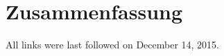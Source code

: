 \documentclass[runningheads,a4paper]{llncs}
\begin{document}
\section{Zusammenfassung}







All links were last followed on December 14, 2015.
\end{document}
